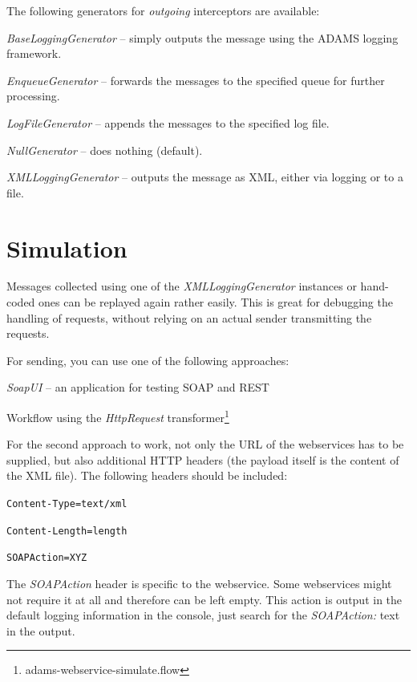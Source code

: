 \documentclass[a4paper]{book}
\begin{document}
\noindent The following generators for \textit{outgoing} interceptors are available:
\begin{tight_itemize}
  \item \textit{BaseLoggingGenerator} -- simply outputs the message using the
  ADAMS logging framework.
  \item \textit{EnqueueGenerator} -- forwards the messages to the specified
  queue for further processing.
  \item \textit{LogFileGenerator} -- appends the messages to the specified log file.
  \item \textit{NullGenerator} -- does nothing (default).
  \item \textit{XMLLoggingGenerator} -- outputs the message as XML, either via
  logging or to a file.
\end{tight_itemize}


\section{Simulation}
Messages collected using one of the \textit{XMLLoggingGenerator} instances or
hand-coded ones can be replayed again rather easily. This is great for
debugging the handling of requests, without relying on an actual sender
transmitting the requests.

For sending, you can use one of the following approaches:
\begin{tight_itemize}
  \item \textit{SoapUI}\cite{soapui} -- an application for testing SOAP and REST
  \item Workflow using the \textit{HttpRequest} transformer\footnote{adams-webservice-simulate.flow}
\end{tight_itemize}

\noindent For the second approach to work, not only the URL of the webservices
has to be supplied, but also additional HTTP headers (the payload itself is the
content of the XML file). The following headers should be included:
\begin{tight_itemize}
  \item \texttt{Content-Type=text/xml}
  \item \texttt{Content-Length=length}
  \item \texttt{SOAPAction=XYZ}
\end{tight_itemize}
The \textit{SOAPAction} header is specific to the webservice. Some webservices
might not require it at all and therefore can be left empty. This action is
output in the default logging information in the console, just search for the
\textit{SOAPAction:} text in the output.



\end{document}
